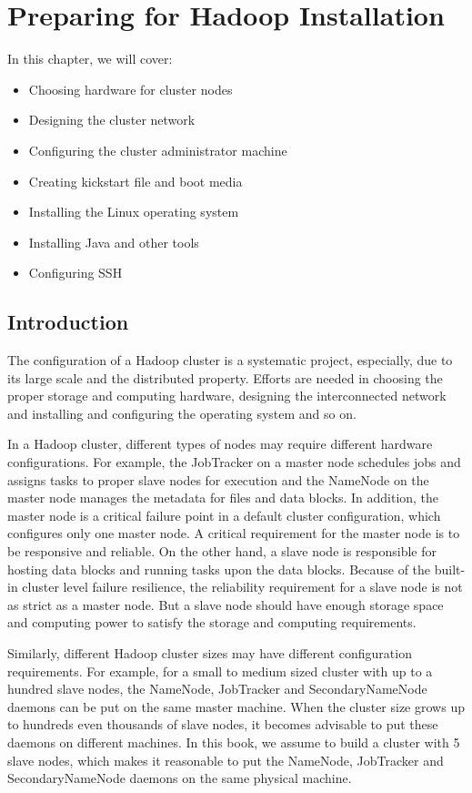 \chapter{Preparing for Hadoop Installation}\label{chap:2}
In this chapter, we will cover:
\begin{itemize}
  \item Choosing hardware for cluster nodes
  \item Designing the cluster network
  \item Configuring the cluster administrator machine
  \item Creating kickstart file and boot media
  \item Installing the Linux operating system
  \item Installing Java and other tools
  \item Configuring SSH
\end{itemize}
\section{Introduction}
The configuration of a Hadoop cluster is a systematic project, especially, due to its large scale and the distributed property. Efforts are needed in choosing the proper storage and computing hardware, designing the interconnected network and installing and configuring the operating system and so on.

In a Hadoop cluster, different types of nodes may require different hardware configurations. For example, the JobTracker on a master node schedules jobs and assigns tasks to proper slave nodes for execution and the NameNode on the master node manages the metadata for files and data blocks. In addition, the master node is a critical failure point in a default cluster configuration, which configures only one master node. A critical requirement for the master node is to be responsive and reliable. On the other hand, a slave node is responsible for hosting data blocks and running tasks upon the data blocks. Because of the built-in cluster level failure resilience, the reliability requirement for a slave node is not as strict as a master node. But a slave node should have enough storage space and computing power to satisfy the storage and computing requirements.

Similarly, different Hadoop cluster sizes may have different configuration requirements. For example, for a small to medium sized cluster with up to a hundred slave nodes, the NameNode, JobTracker and SecondaryNameNode daemons can be put on the same master machine. When the cluster size grows up to hundreds even thousands of slave nodes, it becomes advisable to put these daemons on different machines. In this book, we assume to build a cluster with 5 slave nodes, which makes it reasonable to put the NameNode, JobTracker and SecondaryNameNode daemons on the same physical machine.

